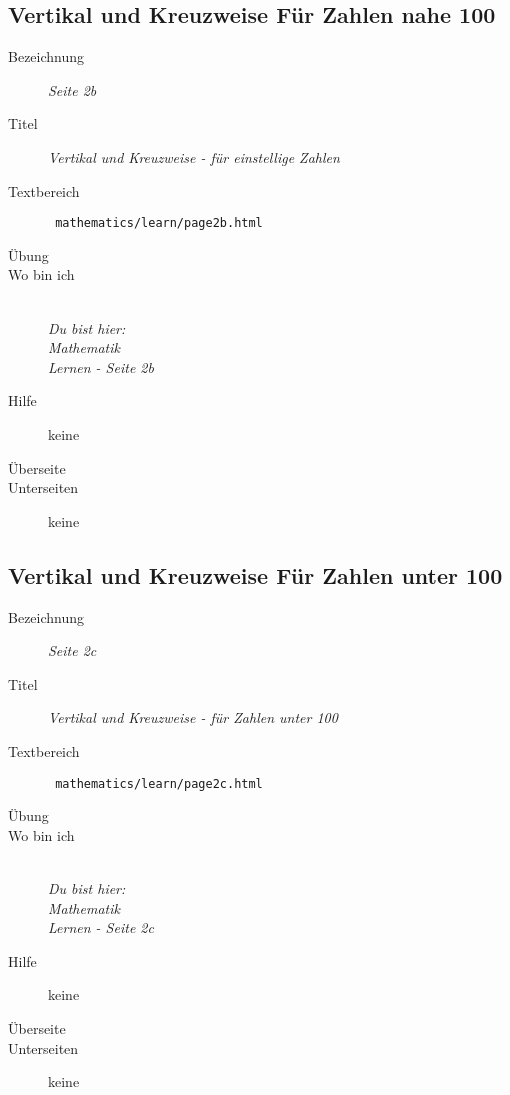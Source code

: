 \subsection{ Vertikal und Kreuzweise Für Zahlen nahe 100 }
\label{cha:math-learn-page2b}
\begin{description}
  \item[Bezeichnung] \emph{ Seite 2b }
  \item[Titel] \emph{ Vertikal und Kreuzweise - für einstellige Zahlen }
  \item[Textbereich] \texttt{ mathematics/learn/page2b.html }
  \item[Übung] 
  \item[Wo bin ich] \emph{\\Du bist hier:\\Mathematik\\Lernen - Seite 2b }
  \item[Hilfe] keine
  \item[Überseite] 
  \item[Unterseiten] keine
\end{description}


\subsection{ Vertikal und Kreuzweise Für Zahlen unter 100 }
\label{cha:math-learn-page2c}
\begin{description}
  \item[Bezeichnung] \emph{ Seite 2c }
  \item[Titel] \emph{ Vertikal und Kreuzweise - für Zahlen unter 100 }
  \item[Textbereich] \texttt{ mathematics/learn/page2c.html }
  \item[Übung] 
  \item[Wo bin ich] \emph{\\Du bist hier:\\Mathematik\\Lernen - Seite 2c }
  \item[Hilfe] keine
  \item[Überseite] 
  \item[Unterseiten] keine
\end{description}


